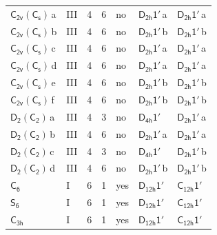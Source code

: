 \documentclass[10pt,a4paper]{article}
\numberwithin{equation}{section}
\newcommand{\grp}[1]{\mathsf{#1}}
\newcommand{\clsletter}[1]{\,{\scriptsize\color{black!55}#1}}
\begin{document}
{\begin{longtable}{@{}llrrlll@{}}
\href{C2v-C1v.pdf}{$\grp{C_{2v}}(\grp{C_{s}})$}\clsletter{a} & III & 4 & 6 & no & \href{D2h-1p.pdf}{$\grp{D_{2h}1'}$}\clsletter{a} & \href{D2h-1p.pdf}{$\grp{D_{2h}1'}$}\clsletter{a}\\
\href{C2v-C1v.pdf}{$\grp{C_{2v}}(\grp{C_{s}})$}\clsletter{b} & III & 4 & 6 & no & \href{D2h-1p.pdf}{$\grp{D_{2h}1'}$}\clsletter{b} & \href{D2h-1p.pdf}{$\grp{D_{2h}1'}$}\clsletter{b}\\
\href{C2v-C1v.pdf}{$\grp{C_{2v}}(\grp{C_{s}})$}\clsletter{c} & III & 4 & 6 & no & \href{D2h-1p.pdf}{$\grp{D_{2h}1'}$}\clsletter{a} & \href{D2h-1p.pdf}{$\grp{D_{2h}1'}$}\clsletter{a}\\
\href{C2v-C1v.pdf}{$\grp{C_{2v}}(\grp{C_{s}})$}\clsletter{d} & III & 4 & 6 & no & \href{D2h-1p.pdf}{$\grp{D_{2h}1'}$}\clsletter{a} & \href{D2h-1p.pdf}{$\grp{D_{2h}1'}$}\clsletter{a}\\
\href{C2v-C1v.pdf}{$\grp{C_{2v}}(\grp{C_{s}})$}\clsletter{e} & III & 4 & 6 & no & \href{D2h-1p.pdf}{$\grp{D_{2h}1'}$}\clsletter{b} & \href{D2h-1p.pdf}{$\grp{D_{2h}1'}$}\clsletter{b}\\
\href{C2v-C1v.pdf}{$\grp{C_{2v}}(\grp{C_{s}})$}\clsletter{f} & III & 4 & 6 & no & \href{D2h-1p.pdf}{$\grp{D_{2h}1'}$}\clsletter{b} & \href{D2h-1p.pdf}{$\grp{D_{2h}1'}$}\clsletter{b}\\
\href{D2-C2.pdf}{$\grp{D_{2}}(\grp{C_{2}})$}\clsletter{a} & III & 4 & 3 & no & \href{D4h-1p.pdf}{$\grp{D_{4h}1'}$} & \href{D2h-1p.pdf}{$\grp{D_{2h}1'}$}\clsletter{a}\\
\href{D2-C2.pdf}{$\grp{D_{2}}(\grp{C_{2}})$}\clsletter{b} & III & 4 & 6 & no & \href{D2h-1p.pdf}{$\grp{D_{2h}1'}$}\clsletter{a} & \href{D2h-1p.pdf}{$\grp{D_{2h}1'}$}\clsletter{a}\\
\href{D2-C2.pdf}{$\grp{D_{2}}(\grp{C_{2}})$}\clsletter{c} & III & 4 & 3 & no & \href{D4h-1p.pdf}{$\grp{D_{4h}1'}$} & \href{D2h-1p.pdf}{$\grp{D_{2h}1'}$}\clsletter{b}\\
\href{D2-C2.pdf}{$\grp{D_{2}}(\grp{C_{2}})$}\clsletter{d} & III & 4 & 6 & no & \href{D2h-1p.pdf}{$\grp{D_{2h}1'}$}\clsletter{b} & \href{D2h-1p.pdf}{$\grp{D_{2h}1'}$}\clsletter{b}\\
\href{../../../rotation/data/pdf/C6.pdf}{$\grp{C_{6}}$} & I & 6 & 1 & yes & \href{D12h-1p.pdf}{$\grp{D_{12h}1'}$} & \href{C12h-1p.pdf}{$\grp{C_{12h}1'}$}\\
\href{../../../rotation/data/pdf/S6.pdf}{$\grp{S_{6}}$} & I & 6 & 1 & yes & \href{D12h-1p.pdf}{$\grp{D_{12h}1'}$} & \href{C12h-1p.pdf}{$\grp{C_{12h}1'}$}\\
\href{../../../rotation/data/pdf/C3h.pdf}{$\grp{C_{3h}}$} & I & 6 & 1 & yes & \href{D12h-1p.pdf}{$\grp{D_{12h}1'}$} & \href{C12h-1p.pdf}{$\grp{C_{12h}1'}$}\\

\end{longtable}}
\end{document}

